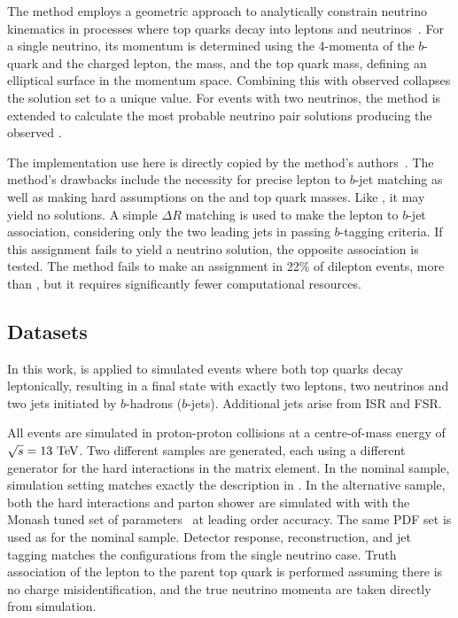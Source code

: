 The \ellipse method employs a geometric approach to analytically constrain neutrino kinematics in processes where top quarks decay into leptons and neutrinos~\cite{EllipseMethod}.
For a single neutrino, its momentum is determined using the 4-momenta of the $b$-quark and the charged lepton, the \Wboson mass, and the top quark mass, defining an elliptical surface in the momentum space.
Combining this with observed \ptmiss collapses the solution set to a unique value. For events with two neutrinos, the method is extended to calculate the most probable neutrino pair solutions producing the observed \ptmiss.

The implementation use here is directly copied by the method's authors~\cite{EllipseCode}.
The method's drawbacks include the necessity for precise lepton to $b$-jet matching as well as making hard assumptions on the \Wboson and top quark masses.
Like \vweight, it may yield no solutions.
A simple $\Delta R$ matching is used to make the lepton to $b$-jet association, considering only the two leading jets in passing $b$-tagging criteria.
If this assignment fails to yield a neutrino solution, the opposite association is tested.
The method fails to make an assignment in 22\% of \ttbar dilepton events, more than \vweight, but it requires significantly fewer computational resources.

\subsection{Datasets}

In this work, \vvflows is applied to simulated \ttbar events where both top quarks decay leptonically, resulting in a final state with exactly two leptons, two neutrinos and two jets initiated by $b$-hadrons ($b$-jets).
Additional jets arise from ISR and FSR.

All events are simulated in proton-proton collisions at a centre-of-mass energy of \mbox{$\sqrt{s}=13~\TeV$}.
Two different samples are generated, each using a different generator for the hard interactions in the matrix element.
In the nominal sample, simulation setting matches exactly the description in .
In the alternative sample, both the hard interactions and parton shower are simulated with  with the Monash tuned set of parameters~\cite{Monash} at leading order accuracy.
The same PDF set is used as for the nominal sample.
Detector response, reconstruction, and jet tagging matches the configurations from the single neutrino case.
Truth association of the lepton to the parent top quark is performed assuming there is no charge misidentification, and the true neutrino momenta are taken directly from simulation.

